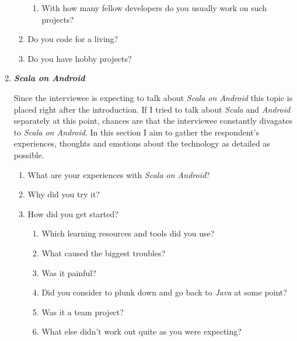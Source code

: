 \begin{enumerate}
\begin{enumerate}
\begin{enumerate}
			\item With how many fellow developers do you usually work on such projects?

		\end{enumerate}

		\item Do you code for a living?

		\item Do you have hobby projects?

	\end{enumerate}

	\item \textbf{\textit{Scala on Android}}

	Since the interviewee is expecting to talk about \textit{Scala on Android} this topic is placed right after the introduction. If I tried to talk about \textit{Scala} and \textit{Android} separately at this point, chances are that the interviewee constantly divagates to \textit{Scala on Android}. In this section I aim to gather the respondent's experiences, thoughts and emotions about the technology as detailed as possible.

	\begin{enumerate}

		\item What are your experiences with \textit{Scala on Android}?

		\item Why did you try it?

		\item How did you get started?

		\begin{enumerate}

			\item Which learning resources and tools did you use?

			\item What caused the biggest troubles?

			\item Was it painful?

			\item Did you consider to plunk down and go back to \textit{Java} at some point?

			\item Was it a team project?

			\item What else didn't work out quite as you were expecting?

		\end{enumerate}


\end{enumerate}
\end{enumerate}
